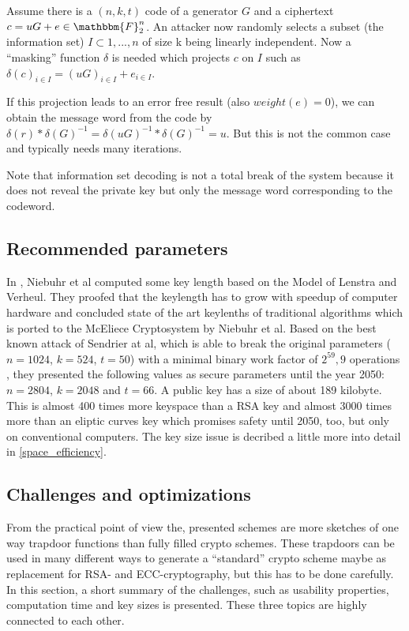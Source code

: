  Assume there is a $(n,k,t)$ code of a generator $G$ and a ciphertext $c = uG + e \in  \mathbbm{F}^n_2$. An attacker now randomly selects a subset (the information set) $I \subset 1, ..., n$ of size k being linearly independent. Now a ``masking'' function $\delta$ is needed which projects $c$ on $I$ such as $\delta(c)_{i \in I} = (uG)_{i\in I}+e_{i\in I}$.
 
 If this projection leads to an error free result (also $weight(e) = 0$), we can obtain the message word from the code by $\delta(r)* \delta(G)^{-1} = \delta(uG)^{-1}*\delta(G)^{-1} = u$. 
 But this is not the common case and typically needs many iterations.
 
 Note that information set decoding is not a total break of the system because it does not reveal the private key but only the message word corresponding to the codeword. 


\subsection*{Recommended parameters}
In \cite{niebuhr2012selecting}, Niebuhr et al computed some key length based on the Model of Lenstra and Verheul. They proofed that the keylength has to grow with speedup of computer hardware and concluded state of the art keylenths of traditional algorithms which is ported to the McEliece Cryptosystem by Niebuhr et al. Based on the best known attack of Sendrier at al, which is able to break the original parameters ($n = 1024$, $k = 524$, $t = 50$) with a minimal binary work factor of $2^59,9$ operations \cite{finiasz2009security}, they presented the following values as secure parameters until the year 2050: $n = 2804$, $k = 2048$ and $t = 66$. A public key has a size of about 189 kilobyte. This is almost 400 times more keyspace than a RSA key and almost 3000 times more than an eliptic curves key which promises safety until 2050, too, but only on conventional computers. The key size issue is decribed a little more into detail in \autoref{space_efficiency}.


\subsection*{Challenges and optimizations} %
From the practical point of view the, presented schemes are more sketches of one way trapdoor functions than fully filled crypto schemes. These trapdoors can be used in many different ways to generate a ``standard'' crypto scheme maybe as replacement for RSA- and ECC-cryptography, but this has to be done carefully. In this section, a short summary of the challenges, such as usability properties, computation time and key sizes is presented.  These three topics are highly connected to each other.\cite{bernstein2009introduction}

